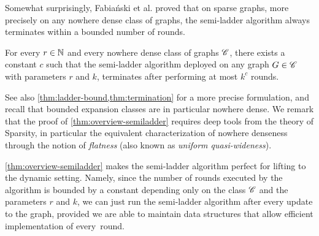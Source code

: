 Somewhat surprisingly, Fabia\'nski et al. proved that on sparse graphs, more precisely on any nowhere dense class of graphs, the semi-ladder algorithm always terminates within a bounded number of rounds.

\begin{theorem}\label{thm:overview-semiladder}
	For every $r\in \mathbb{N}$ and every nowhere dense class of graphs $\mathscr C$, there exists a constant $c$ such that the semi-ladder algorithm deployed on any graph $G\in \mathscr C$ with parameters $r$ and $k$, terminates after performing at most $k^c$ rounds.
\end{theorem}

See also \cref{thm:ladder-bound,thm:termination} for a more precise formulation, and recall that bounded expansion classes are in particular nowhere dense. We remark that the proof of \cref{thm:overview-semiladder} requires deep tools from the theory of Sparsity, in particular the equivalent characterization of nowhere denseness through the notion of \emph{flatness} (also known as \emph{uniform quasi-wideness}).

\cref{thm:overview-semiladder} makes the semi-ladder algorithm perfect for lifting to the dynamic setting. Namely, since the number of rounds executed by the algorithm is bounded by a constant depending only on the class $\mathscr C$ and the parameters $r$ and $k$, we can just run the semi-ladder algorithm after every update to the graph, provided we are able to maintain data structures that allow efficient implementation of every~round.

